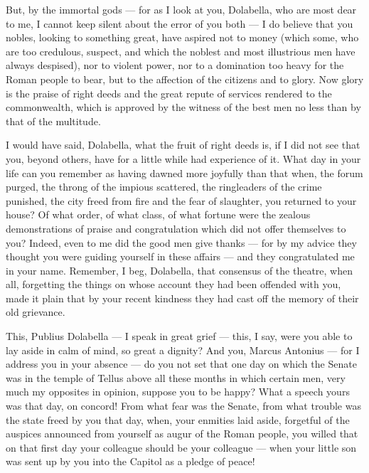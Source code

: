  But, by the immortal gods --- for as I look at you, Dolabella, who are most dear to me, I cannot keep silent about the error of you both --- I do believe that you nobles, looking to something great, have aspired not to money (which some, who are too credulous, suspect, and which the noblest and most illustrious men have always despised), nor to violent power, nor to a domination too heavy for the Roman people to bear, but to the affection of the citizens and to glory. Now glory is the praise of right deeds and the great repute of services rendered to the commonwealth, which is approved by the witness of the best men no less than by that of the multitude.

 I would have said, Dolabella, what the fruit of right deeds is, if I did not see that you, beyond others, have for a little while had experience of it. What day in your life can you remember as having dawned more joyfully than that when, the forum purged, the throng of the impious scattered, the ringleaders of the crime punished, the city freed from fire and the fear of slaughter, you returned to your house? Of what order, of what class, of what fortune were the zealous demonstrations of praise and congratulation which did not offer themselves to you? Indeed, even to me did the good men give thanks --- for by my advice they thought you were guiding yourself in these affairs --- and they congratulated me in your name. Remember, I beg, Dolabella, that consensus of the theatre, when all, forgetting the things on whose account they had been offended with you, made it plain that by your recent kindness they had cast off the memory of their old grievance.

 This, Publius Dolabella --- I speak in great grief --- this, I say, were you able to lay aside in calm of mind, so great a dignity? And you, Marcus Antonius --- for I address you in your absence --- do you not set that one day on which the Senate was in the temple of Tellus above all these months in which certain men, very much my opposites in opinion, suppose you to be happy? What a speech yours was that day, on concord! From what fear was the Senate, from what trouble was the state freed by you that day, when, your enmities laid aside, forgetful of the auspices announced from yourself as augur of the Roman people, you willed that on that first day your colleague should be your colleague --- when your little son was sent up by you into the Capitol as a pledge of peace!

